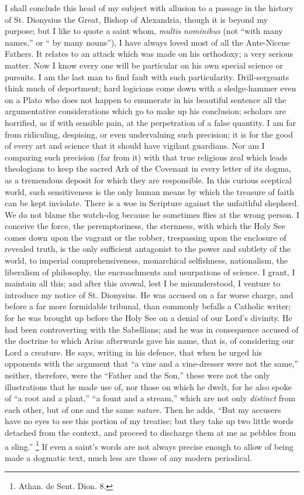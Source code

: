 I shall conclude this head of my subject with
allusion to a passage in the history of St. Dionysius the Great, Bishop
of Alexandria, though it is beyond my purpose; but I like to quote a
saint whom, \emph{multis nominibus} (not ``with many names,'' or `` by many
nouns''), I have always loved most of all the Ante-Nicene Fathers. It
relates to an attack which was made on his orthodoxy; a very serious
matter. Now I know every one will be particular on his own special
science or pursuits. I am the last man to find fault with such
particularity. Drill-sergeants think much of deportment; hard logicians
come down with a sledge-hammer even on a Plato who does not happen to
enumerate in his beautiful sentence all the argumentative considerations
which go to make up his conclusion; scholars are horrified, as if with
sensible pain, at the perpetration of a false quantity. I am far from
ridiculing, despising, or even undervaluing such precision; it is for
the good of every art and science that it should have vigilant
guardians. Nor am I comparing such precision (far from it) with that
true religious zeal which leads theologians to keep the sacred Ark of
the Covenant in every letter of its dogma, as a tremendous deposit for
which they are responsible. In this curious sceptical world, such
sensitiveness is the only human means by which the treasure of
faith can be kept inviolate. There is a woe in Scripture against the
unfaithful shepherd. We do not blame the watch-dog because he sometimes
flies at the wrong person. I conceive the force, the peremptoriness, the
sternness, with which the Holy See comes down upon the vagrant or the
robber, trespassing upon the enclosure of revealed truth, is the only
sufficient antagonist to the power and subtlety of the world, to
imperial comprehensiveness, monarchical selfishness, nationalism, the
liberalism of philosophy, the encroachments and usurpations of science.
I grant, I maintain all this; and after this avowal, lest I be
misunderstood, I venture to introduce my notice of St. Dionysius. He was
accused on a far worse charge, and before a far more formidable
tribunal, than commonly befalls a Catholic writer; for he was brought up
before the Holy See on a denial of our Lord's divinity. He had been
controverting with the Sabellians; and he was in consequence accused of
the doctrine to which Arius afterwards gave his name, that is, of
considering our Lord a creature. He says, writing in his defence, that
when he urged his opponents with the argument that ``a vine and a
vine-dresser were not the same,'' neither, therefore, were the ``Father
and the Son,'' these were not the only illustrations that he made use of,
nor those on which he dwelt, for he also spoke of ``a root and a plant,'' ``a
fount and a stream,'' which are not only \emph{distinct} from each other,
but of one and the same \emph{nature}. Then he adds, ``But my accusers
have no eyes to see this portion of my treatise; but they take up two
little words detached from the context, and proceed to discharge them at
me as pebbles from a sling.'' \footnote{Athan. de Sent. Dion. 8.}
If even a saint's words are not always precise enough to allow of being
made a dogmatic text, much less are those of any modern periodical.

